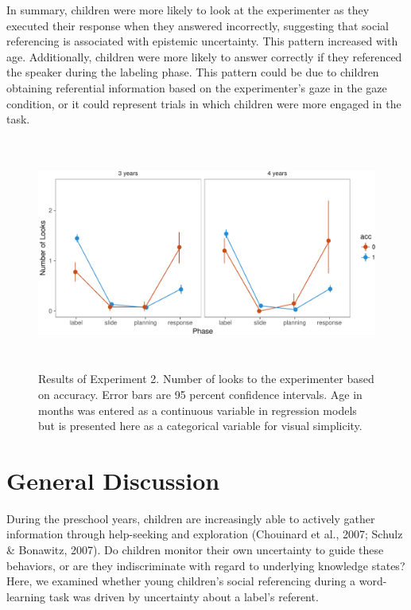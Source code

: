 \documentclass[a4paper,man,apacite,floatsintext]{apa6}
\newenvironment{CodeChunk}{}{}
\begin{document}
In summary, children were more likely to look at the experimenter as
they executed their response when they answered incorrectly, suggesting
that social referencing is associated with epistemic uncertainty. This
pattern increased with age. Additionally, children were more likely to
answer correctly if they referenced the speaker during the labeling
phase. This pattern could be due to children obtaining referential
information based on the experimenter's gaze in the gaze condition, or
it could represent trials in which children were more engaged in the
task.

\begin{CodeChunk}
\begin{figure}[h]

{\centering \includegraphics[width=6in,height=3in]{figs/acc_results_e2-1} 

}

\caption[Results of Experiment 2]{Results of Experiment 2. Number of looks to the experimenter based on accuracy. Error bars are 95 percent confidence intervals. Age in months was entered as a continuous variable in regression models but is presented here as a categorical variable for visual simplicity.}\label{fig:acc_results_e2}
\end{figure}
\end{CodeChunk}

\section{General Discussion}\label{general-discussion}

During the preschool years, children are increasingly able to actively
gather information through help-seeking and exploration (Chouinard et
al., 2007; Schulz \& Bonawitz, 2007). Do children monitor their own
uncertainty to guide these behaviors, or are they indiscriminate with
regard to underlying knowledge states? Here, we examined whether young
children's social referencing during a word-learning task was driven by
uncertainty about a label's referent.
\end{document}
